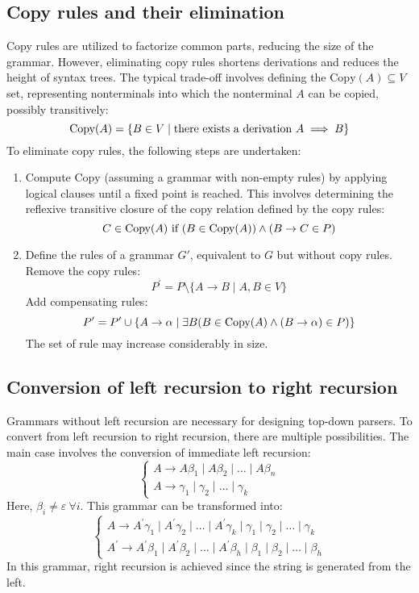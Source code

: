 \subsection{Copy rules and their elimination}
Copy rules are utilized to factorize common parts, reducing the size of the grammar.
However, eliminating copy rules shortens derivations and reduces the height of syntax trees.
The typical trade-off involves defining the $\text{Copy}(A)\subseteq V$ set, representing nonterminals into which the nonterminal $A$ can be copied, possibly transitively:
\[\textnormal{Copy}(A)=\{B \in V \mid  \textnormal{there exists a derivation } A \implies B\}\]
To eliminate copy rules, the following steps are undertaken:
\begin{enumerate}
    \item Compute $\text{Copy}$ (assuming a grammar with non-empty rules) by applying logical clauses until a fixed point is reached. 
        This involves determining the reflexive transitive closure of the copy relation defined by the copy rules:
        \[C \in \textnormal{Copy}(A) \textnormal{ if } (B \in \textnormal{Copy}(A)) \land (B \rightarrow C \in P)\]
    \item  Define the rules of a grammar $G'$, equivalent to $G$ but without copy rules. 
        Remove the copy rules:
        \[P^{\prime}=P \setminus \{A \rightarrow B\mid A,B \in V\}\]
        Add compensating rules:
        \[P^{\prime}=P^{\prime}\cup\{A \rightarrow \alpha\mid\exists B (B \in \textnormal{Copy}(A) \land (B \rightarrow \alpha) \in P)\}\]
        The set of rule may increase considerably in size. 
\end{enumerate}

\subsection{Conversion of left recursion to right recursion}
Grammars without left recursion are necessary for designing top-down parsers. 
To convert from left recursion to right recursion, there are multiple possibilities. 
The main case involves the conversion of immediate left recursion:
\[\begin{cases}
    A \rightarrow A\beta_1\mid A\beta_2\mid \dots\mid A\beta_n \\
    A \rightarrow \gamma_1\mid \gamma_2\mid \dots\mid \gamma_k
\end{cases}\]
Here, $\beta_i \neq \varepsilon \: \forall i$. 
This grammar can be transformed into:
\[\begin{cases}
    A \rightarrow A^{\prime}\gamma_1\mid A^{\prime}\gamma_2\mid \dots\mid A^{\prime}\gamma_k\mid \gamma_1\mid \gamma_2\mid \dots\mid \gamma_k  \\
    A^{\prime} \rightarrow A^{\prime}\beta_1\mid A^{\prime}\beta_2\mid \dots\mid A^{\prime}\beta_h\mid \beta_1\mid \beta_2\mid \dots\mid \beta_h
\end{cases}\]
In this grammar, right recursion is achieved since the string is generated from the left.

